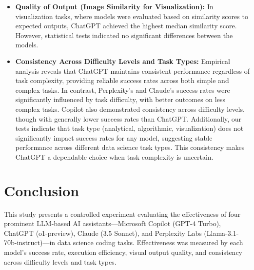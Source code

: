 \documentclass[conference]{IEEEtran}
\begin{document}
\begin{itemize}
    \item \textbf{Quality of Output (Image Similarity for Visualization):} In visualization tasks, where models were evaluated based on similarity scores to expected outputs, ChatGPT achieved the highest median similarity score. However, statistical tests indicated no significant differences between the models. %
    \item \textbf{Consistency Across Difficulty Levels and Task Types:} Empirical analysis reveals that ChatGPT maintains consistent performance regardless of task complexity, providing reliable success rates across both simple and complex tasks. In contrast, Perplexity's and Claude's success rates were significantly influenced by task difficulty, with better outcomes on less complex tasks. Copilot also demonstrated consistency across difficulty levels, though with generally lower success rates than ChatGPT. Additionally, our tests indicate that task type (analytical, algorithmic, visualization) does not significantly impact success rates for any model, suggesting stable performance across different data science task types. This consistency makes ChatGPT a dependable choice when task complexity is uncertain.
\end{itemize}

\section{Conclusion} \label{sec:conclusion}


This study presents a controlled experiment evaluating the effectiveness of four prominent LLM-based AI assistants—Microsoft Copilot (GPT-4 Turbo), ChatGPT (o1-preview), Claude (3.5 Sonnet), and Perplexity Labs (Llama-3.1-70b-instruct)—in data science coding tasks. Effectiveness was measured by each model's success rate, execution efficiency, visual output quality, and consistency across difficulty levels and task types.
\end{document}
